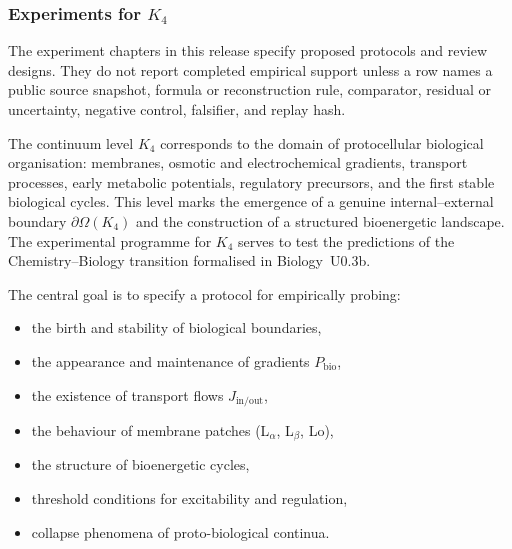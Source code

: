 
\subsubsection{Experiments for \texorpdfstring{$K_4$}{K_4}}

The experiment chapters in this release specify proposed protocols and review designs. They do not report completed empirical support unless a row names a public source snapshot, formula or reconstruction rule, comparator, residual or uncertainty, negative control, falsifier, and replay hash.
\label{sec:experiments-k4}

The continuum level $K_4$ corresponds to the domain of protocellular
biological organisation: membranes, osmotic and electrochemical
gradients, transport processes, early metabolic potentials,
regulatory precursors, and the first stable biological cycles.
This level marks the emergence of a genuine internal–external
boundary $\partial\Omega(K_4)$ and the construction of a structured
bioenergetic landscape.
The experimental programme for $K_4$ serves to test the
predictions of the Chemistry--Biology transition formalised in
Biology~U0.3b.

The central goal is to specify a protocol for empirically probing:

\begin{itemize}
    \item the birth and stability of biological boundaries,
    \item the appearance and maintenance of gradients $P_{\mathrm{bio}}$,
    \item the existence of transport flows $J_{\mathrm{in/out}}$,
    \item the behaviour of membrane patches (L$_\alpha$, L$_\beta$, Lo),
    \item the structure of bioenergetic cycles,
    \item threshold conditions for excitability and regulation,
    \item collapse phenomena of proto-biological continua.
\end{itemize}



